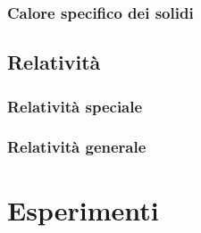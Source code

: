 \documentclass[letterpaper,10pt,italian]{jupyterBook}
\begin{document}
\subsection{Calore specifico dei solidi}
\label{\detokenize{ch/modern/intro-experiments:calore-specifico-dei-solidi}}\label{\detokenize{ch/modern/intro-experiments:physics-hs-modern-intro-experiences-heat-capacity}}

\section{Relatività}
\label{\detokenize{ch/modern/intro-experiments:relativita}}\label{\detokenize{ch/modern/intro-experiments:physics-hs-modern-intro-relativity}}

\subsection{Relatività speciale}
\label{\detokenize{ch/modern/intro-experiments:relativita-speciale}}\label{\detokenize{ch/modern/intro-experiments:physics-hs-modern-intro-relativity-special}}

\subsection{Relatività generale}
\label{\detokenize{ch/modern/intro-experiments:relativita-generale}}\label{\detokenize{ch/modern/intro-experiments:physics-hs-modern-intro-relativity-general}}
\sphinxstepscope


\chapter{Esperimenti}
\label{\detokenize{ch/modern/experiments:esperimenti}}\label{\detokenize{ch/modern/experiments:modern-experiments}}\label{\detokenize{ch/modern/experiments::doc}}
\end{document}
